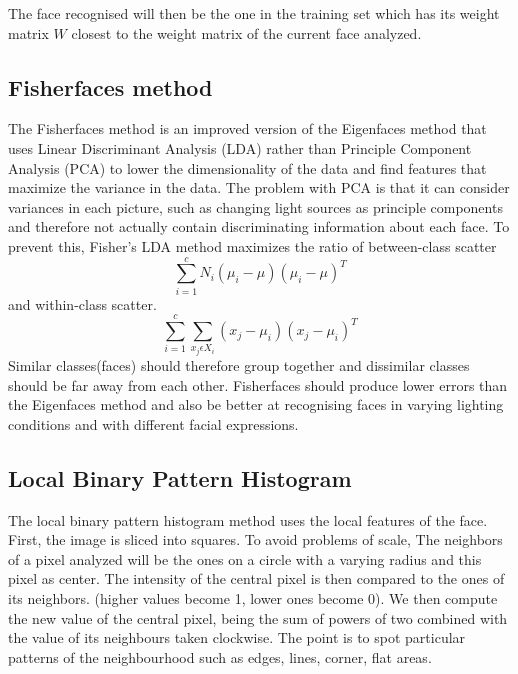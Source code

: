 The face recognised will then be the one in the training set which has its weight matrix $W$ closest to the weight matrix of the current face analyzed. 

\subsection{Fisherfaces method}

The Fisherfaces method is an improved version of the Eigenfaces method that uses Linear Discriminant Analysis (LDA) rather than Principle Component Analysis (PCA) to lower the dimensionality of the data and find features that maximize the variance in the data. The problem with PCA is that it can consider variances in each picture, such as changing light sources as principle components and therefore not actually contain discriminating information about each face. To prevent this, Fisher's LDA method maximizes the ratio of between-class scatter 
\begin{equation}
	\sum\limits_{i=1}^{c}N_{i}(\mu_{i}-\mu)(\mu_{i}-\mu)^T
\end{equation}
and within-class scatter.
\begin{equation}
	\sum\limits_{i=1}^{c}\sum\limits_{x_{j}\epsilon X_{i}}^{}(x_{j}-\mu_{i})(x_{j}-\mu_{i})^T
\end{equation}
Similar classes(faces) should therefore group together and dissimilar classes should be far away from each other.
Fisherfaces should produce lower errors than the Eigenfaces method and also be better at recognising faces in varying lighting conditions and with different facial expressions.\cite{Eigenfaces_vs_Fisherfaces}

\subsection{Local Binary Pattern Histogram}

The local binary pattern histogram method uses the local features of the face. First, the image is sliced into squares.
To avoid problems of scale, The neighbors of a pixel analyzed will be the ones on a circle with a varying radius and this pixel as center.
The intensity of the central pixel is then compared to the ones of its neighbors. (higher values become 1, lower ones become 0).
We then compute the new value of the central pixel, being the sum of powers of two combined with the value of its neighbours taken clockwise. The point is to spot particular patterns of the neighbourhood such as edges, lines, corner, flat areas.


